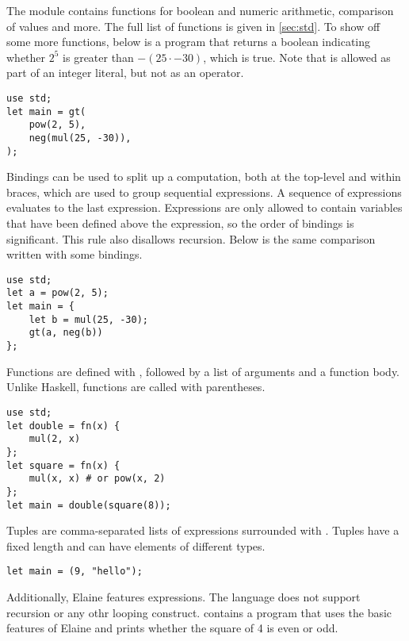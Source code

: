 The  module contains functions for boolean and numeric arithmetic, comparison of values and more. The full list of functions is given in \cref{sec:std}. To show off some more functions, below is a program that returns a boolean indicating whether $2^5$ is greater than $- (25 \cdot -30)$, which is true. Note that \el{-} is allowed as part of an integer literal, but not as an operator.

\begin{lstlisting}[language=elaine,style=fancy]
use std;
let main = gt(
    pow(2, 5),
    neg(mul(25, -30)),
);
\end{lstlisting}

Bindings can be used to split up a computation, both at the top-level and within braces, which are used to group sequential expressions. A sequence of expressions evaluates to the last expression. Expressions are only allowed to contain variables that have been defined above the expression, so the order of bindings is significant. This rule also disallows recursion. Below is the same comparison written with some bindings.

\begin{lstlisting}[language=elaine,style=fancy]
use std;
let a = pow(2, 5);
let main = {
    let b = mul(25, -30);
    gt(a, neg(b))
};
\end{lstlisting}

Functions are defined with , followed by a list of arguments and a function body. Unlike Haskell, functions are called with parentheses.

\begin{lstlisting}[language=elaine,style=fancy]
use std;
let double = fn(x) {
    mul(2, x)
};
let square = fn(x) {
    mul(x, x) # or pow(x, 2)
};
let main = double(square(8));
\end{lstlisting}

Tuples are comma-separated lists of expressions surrounded with \el{()}. Tuples have a fixed length and can have elements of different types.

\begin{lstlisting}[language=elaine,style=fancy]
let main = (9, "hello");
\end{lstlisting}

Additionally, Elaine features  expressions. The language does not support recursion or any othr looping construct.  contains a program that uses the basic features of Elaine and prints whether the square of 4 is even or odd. 

